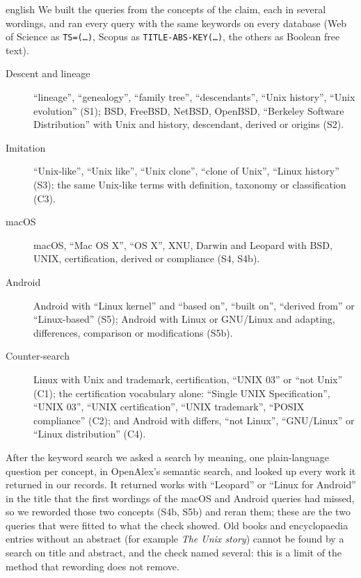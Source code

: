 \begin{onlyin}{english}
We built the queries from the concepts of the claim, each in several
wordings, and ran every query with the same keywords on every database
(Web of Science as \texttt{TS=(\dots)}, Scopus as
\texttt{TITLE-ABS-KEY(\dots)}, the others as Boolean free text).
\begingroup\raggedright
\begin{description}
  \item[Descent and lineage] \enquote{lineage}, \enquote{genealogy},
    \enquote{family tree}, \enquote{descendants}, \enquote{Unix history},
    \enquote{Unix evolution} (S1); BSD, FreeBSD, NetBSD, OpenBSD,
    \enquote{Berkeley Software Distribution} with Unix and
    history, descendant, derived or origins (S2).
  \item[Imitation] \enquote{Unix-like}, \enquote{Unix like},
    \enquote{Unix clone}, \enquote{clone of Unix}, \enquote{Linux
    history} (S3); the same Unix-like terms with definition, taxonomy or
    classification (C3).
  \item[macOS] macOS, \enquote{Mac OS X}, \enquote{OS X}, XNU, Darwin and
    Leopard with BSD, UNIX, certification, derived or compliance (S4,
    S4b).
  \item[Android] Android with \enquote{Linux kernel} and \enquote{based
    on}, \enquote{built on}, \enquote{derived from} or
    \enquote{Linux-based} (S5); Android with Linux or GNU/Linux and
    adapting, differences, comparison or modifications (S5b).
  \item[Counter-search] Linux with Unix and trademark, certification,
    \enquote{UNIX 03} or \enquote{not Unix} (C1); the certification
    vocabulary alone: \enquote{Single UNIX Specification},
    \enquote{UNIX 03}, \enquote{UNIX certification}, \enquote{UNIX
    trademark}, \enquote{POSIX compliance} (C2); and Android with
    differs, \enquote{not Linux}, \enquote{GNU/Linux} or
    \enquote{Linux distribution} (C4).
\end{description}
\par\endgroup
After the keyword search we asked a search by meaning, one plain-language
question per concept, in OpenAlex's semantic search, and looked up every
work it returned in our records.
It returned works with \enquote{Leopard} or \enquote{Linux for Android}
in the title that the first wordings of the macOS and Android queries
had missed, so we reworded those two concepts (S4b, S5b) and reran them;
these are the two queries that were fitted to what the check showed.
Old books and encyclopaedia entries without an abstract (for example
\emph{The Unix story}) cannot be found by a search on title and abstract,
and the check named several: this is a limit of the method that rewording
does not remove.
\end{onlyin}
